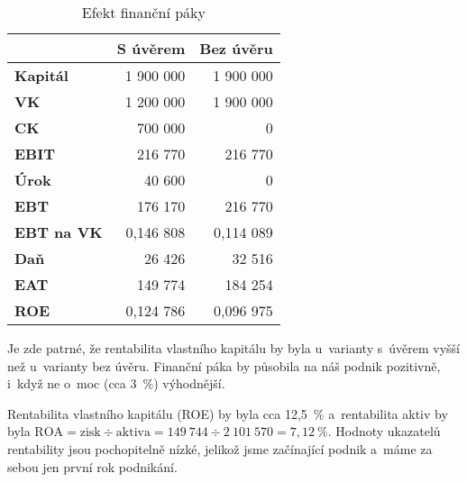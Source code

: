 \begin{table}[htbp]
\begin{center}
\begin{tabular}{ l | r r }
& \multicolumn{1}{|c}{\textbf{S úvěrem}\index{úvěr}} & \multicolumn{1}{l}{\textbf{Bez úvěru}\index{úvěr}} \\ \hline
\textbf{Kapitál}              & 1 900 000                             & 1 900 000                              \\
\textbf{VK}                   & 1 200 000                             & 1 900 000                              \\
\textbf{CK}                   & 700 000                               & 0                                      \\
\textbf{EBIT\index{EBIT}}                 & 216 770                               & 216 770                                \\
\textbf{Úrok}                 & 40 600                                & 0                                      \\
\textbf{EBT}                  & 176 170                               & 216 770                                \\
\textbf{EBT na VK}            & 0,146 808                              & 0,114 089                               \\
\textbf{Daň}                  & 26 426                                & 32 516                                 \\
\textbf{EAT\index{EAT}}                  & 149 774                               & 184 254                                \\
\textbf{ROE}                  & 0,124 786                              & 0,096 975                              
\end{tabular}
\caption{Efekt finanční páky \cite{mikovcova_schollerova}}
\label{efekt_financni_paky}
\end{center}
\end{table}

Je zde patrné, že rentabilita vlastního kapitálu by byla u~varianty s~úvěrem vyšší než u~varianty bez úvěru. Finanční páka by působila na náš podnik pozitivně, i~když ne o~moc (cca 3~\%) výhodnější.

Rentabilita vlastního kapitálu (ROE) by byla cca 12,5~\% a~rentabilita aktiv by byla $ \text{ROA} = \text{zisk} \div \text{aktiva} = 149~744 \div 2~101~570 = 7,12~\%$. Hodnoty ukazatelů rentability jsou pochopitelně nízké, jelikož jsme začínající podnik a~máme za sebou jen první  rok podnikání.





